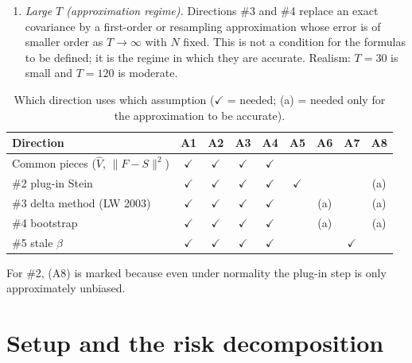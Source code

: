 \documentclass[11pt]{article}
\theoremstyle{remark}
\begin{document}
\begin{enumerate}
  \item[(A8)] \emph{Large $T$ (approximation regime).} Directions \#3 and \#4 replace an exact covariance by a first-order or resampling approximation whose error is of smaller order as $T \to \infty$ with $N$ fixed. This is not a condition for the formulas to be defined; it is the regime in which they are accurate. Realism: $T = 30$ is small and $T = 120$ is moderate.
\end{enumerate}

\begin{table}[h]
\centering
\caption{Which direction uses which assumption ($\checkmark$ = needed; (a) = needed only for the approximation to be accurate).}\label{tab:assump}
\begin{tabular}{@{}lcccccccc@{}}
\toprule
Direction & A1 & A2 & A3 & A4 & A5 & A6 & A7 & A8 \\
\midrule
Common pieces ($\hat V$, $\|F - S\|^2$) & $\checkmark$ & $\checkmark$ & $\checkmark$ & $\checkmark$ & & & & \\
\#2 plug-in Stein & $\checkmark$ & $\checkmark$ & $\checkmark$ & $\checkmark$ & $\checkmark$ & & & (a) \\
\#3 delta method (LW 2003) & $\checkmark$ & $\checkmark$ & $\checkmark$ & $\checkmark$ & & (a) & & (a) \\
\#4 bootstrap & $\checkmark$ & $\checkmark$ & $\checkmark$ & $\checkmark$ & & (a) & & (a) \\
\#5 stale $\beta$ & $\checkmark$ & $\checkmark$ & $\checkmark$ & $\checkmark$ & & & $\checkmark$ & \\
\bottomrule
\end{tabular}
\end{table}

For \#2, (A8) is marked because even under normality the plug-in step is only approximately unbiased.

\section{Setup and the risk decomposition}
\end{document}
